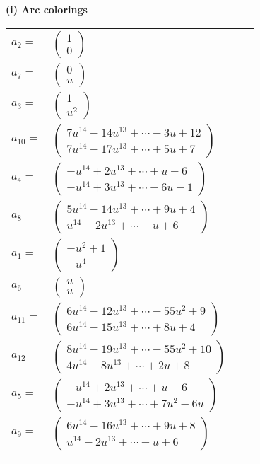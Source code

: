 \documentclass[1p]{elsarticle_modified}
\theoremstyle{definition}
\begin{document}
\flushleft \textbf{(i) Arc colorings}\\
\begin{tabular}{m{7pt} m{180pt} m{7pt} m{180pt} }
\flushright $a_{2}=$&$\begin{pmatrix}1\\0\end{pmatrix}$ \\
\flushright $a_{7}=$&$\begin{pmatrix}0\\u\end{pmatrix}$ \\
\flushright $a_{3}=$&$\begin{pmatrix}1\\u^2\end{pmatrix}$ \\
\flushright $a_{10}=$&$\begin{pmatrix}7 u^{14}-14 u^{13}+\cdots-3 u+12\\7 u^{14}-17 u^{13}+\cdots+5 u+7\end{pmatrix}$ \\
\flushright $a_{4}=$&$\begin{pmatrix}- u^{14}+2 u^{13}+\cdots+u-6\\- u^{14}+3 u^{13}+\cdots-6 u-1\end{pmatrix}$ \\
\flushright $a_{8}=$&$\begin{pmatrix}5 u^{14}-14 u^{13}+\cdots+9 u+4\\u^{14}-2 u^{13}+\cdots- u+6\end{pmatrix}$ \\
\flushright $a_{1}=$&$\begin{pmatrix}- u^2+1\\- u^4\end{pmatrix}$ \\
\flushright $a_{6}=$&$\begin{pmatrix}u\\u\end{pmatrix}$ \\
\flushright $a_{11}=$&$\begin{pmatrix}6 u^{14}-12 u^{13}+\cdots-55 u^2+9\\6 u^{14}-15 u^{13}+\cdots+8 u+4\end{pmatrix}$ \\
\flushright $a_{12}=$&$\begin{pmatrix}8 u^{14}-19 u^{13}+\cdots-55 u^2+10\\4 u^{14}-8 u^{13}+\cdots+2 u+8\end{pmatrix}$ \\
\flushright $a_{5}=$&$\begin{pmatrix}- u^{14}+2 u^{13}+\cdots+u-6\\- u^{14}+3 u^{13}+\cdots+7 u^2-6 u\end{pmatrix}$ \\
\flushright $a_{9}=$&$\begin{pmatrix}6 u^{14}-16 u^{13}+\cdots+9 u+8\\u^{14}-2 u^{13}+\cdots- u+6\end{pmatrix}$\\&\end{tabular}
\end{document}
